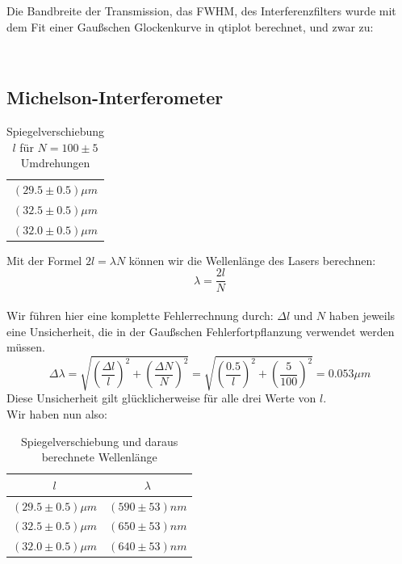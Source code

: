 \documentclass{article}
\begin{document}
Die Bandbreite der Transmission, das FWHM, des Interferenzfilters wurde mit dem Fit einer Gaußschen Glockenkurve in qtiplot berechnet, und zwar zu:
\begin{flushleft}
 \\
\end{flushleft}

\subsection{Michelson-Interferometer}
\begin{table}[H]
\begin{center}
\begin{tabular}{c}
$(29.5\pm 0.5)\mu m$\\
$(32.5\pm 0.5)\mu m$\\
$(32.0\pm 0.5)\mu m$\\
\end{tabular}
\caption{Spiegelverschiebung $l$ für $N=100 \pm 5$ Umdrehungen}
\end{center}
\end{table}
\vspace{0.3mm}

Mit der Formel $2 l=\lambda N$ können wir die Wellenlänge des Lasers berechnen:
$$\lambda=\frac{2l}{N}$$
\\
Wir führen hier eine komplette Fehlerrechnung durch:
$\Delta l$ und $N$ haben jeweils eine Unsicherheit, die in der Gaußschen Fehlerfortpflanzung verwendet werden müssen.\\
$$\Delta \lambda=\sqrt{\left(\frac{\Delta l}{l}\right)^2+\left(\frac{\Delta N}{N}\right)^2}=\sqrt{\left(\frac{0.5}{l}\right)^2+\left(\frac{5}{100}\right)^2}=0.053 \mu m$$
Diese Unsicherheit gilt glücklicherweise für alle drei Werte von $l$.\\
Wir haben nun also: 
\begin{table}[H]
\begin{center}
\begin{tabular}{|c|c|}
\hline
$l$ & $\lambda$\\
\hline
$(29.5\pm 0.5)\mu m$ & $(590 \pm 53)nm$\\
$(32.5\pm 0.5)\mu m$ & $(650 \pm 53)nm$\\
$(32.0\pm 0.5)\mu m$ & $(640 \pm 53)nm$\\
\hline
\end{tabular}
\caption{Spiegelverschiebung und daraus berechnete Wellenlänge}
\end{center}
\end{table}
\vspace{0.3mm}
\end{document}
